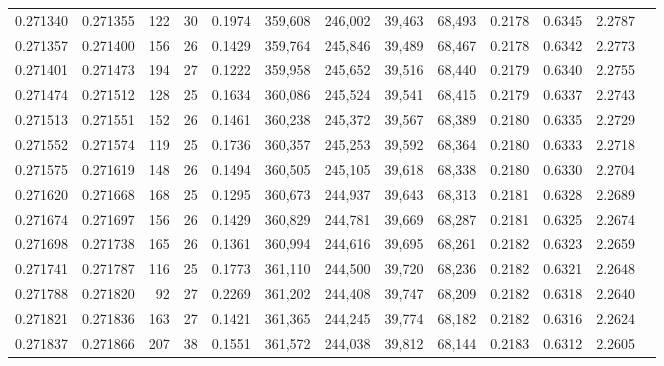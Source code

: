 \begin{tabular}{rrrrrrrrrrrrr}
0.271340 & 0.271355 &   122 &  30 &                                     0.1974 & 359,608 & 246,002 &  39,463 &  68,493 & 0.2178 & 0.6345 & 2.2787 \\
0.271357 & 0.271400 &   156 &  26 &                                     0.1429 & 359,764 & 245,846 &  39,489 &  68,467 & 0.2178 & 0.6342 & 2.2773 \\
0.271401 & 0.271473 &   194 &  27 &                                     0.1222 & 359,958 & 245,652 &  39,516 &  68,440 & 0.2179 & 0.6340 & 2.2755 \\
0.271474 & 0.271512 &   128 &  25 &                                     0.1634 & 360,086 & 245,524 &  39,541 &  68,415 & 0.2179 & 0.6337 & 2.2743 \\
0.271513 & 0.271551 &   152 &  26 &                                     0.1461 & 360,238 & 245,372 &  39,567 &  68,389 & 0.2180 & 0.6335 & 2.2729 \\
0.271552 & 0.271574 &   119 &  25 &                                     0.1736 & 360,357 & 245,253 &  39,592 &  68,364 & 0.2180 & 0.6333 & 2.2718 \\
0.271575 & 0.271619 &   148 &  26 &                                     0.1494 & 360,505 & 245,105 &  39,618 &  68,338 & 0.2180 & 0.6330 & 2.2704 \\
0.271620 & 0.271668 &   168 &  25 &                                     0.1295 & 360,673 & 244,937 &  39,643 &  68,313 & 0.2181 & 0.6328 & 2.2689 \\
0.271674 & 0.271697 &   156 &  26 &                                     0.1429 & 360,829 & 244,781 &  39,669 &  68,287 & 0.2181 & 0.6325 & 2.2674 \\
0.271698 & 0.271738 &   165 &  26 &                                     0.1361 & 360,994 & 244,616 &  39,695 &  68,261 & 0.2182 & 0.6323 & 2.2659 \\
0.271741 & 0.271787 &   116 &  25 &                                     0.1773 & 361,110 & 244,500 &  39,720 &  68,236 & 0.2182 & 0.6321 & 2.2648 \\
0.271788 & 0.271820 &    92 &  27 &                                     0.2269 & 361,202 & 244,408 &  39,747 &  68,209 & 0.2182 & 0.6318 & 2.2640 \\
0.271821 & 0.271836 &   163 &  27 &                                     0.1421 & 361,365 & 244,245 &  39,774 &  68,182 & 0.2182 & 0.6316 & 2.2624 \\
0.271837 & 0.271866 &   207 &  38 &                                     0.1551 & 361,572 & 244,038 &  39,812 &  68,144 & 0.2183 & 0.6312 & 2.2605 \\

\end{tabular}

